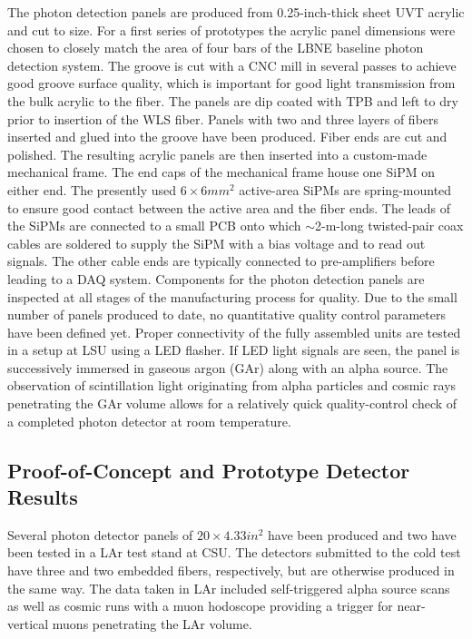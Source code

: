 The photon detection panels are produced from 0.25-inch-thick
sheet UVT acrylic and cut to size. For a first series of prototypes
the acrylic panel dimensions were chosen to closely match the area of
four bars of the LBNE baseline  photon detection system.  The groove is
cut with a CNC mill in several passes to achieve good groove surface
quality, which is important for good light transmission from the bulk
acrylic to the fiber. The panels are dip coated with TPB and left to
dry prior to insertion of the WLS fiber. Panels with two and three
layers of fibers inserted and glued into the groove have been
produced. Fiber ends are cut and polished.  The resulting acrylic
panels are then inserted into a custom-made mechanical frame.%
The end caps of the mechanical frame
house one SiPM on either end. The presently used $6\times6 mm^2$ active-area
SiPMs are spring-mounted to ensure good contact between the active area
and the fiber ends.  The leads of the SiPMs are connected to a small
PCB  onto which $\sim$2-m-long twisted-pair coax cables are soldered to
supply the SiPM with a bias voltage and to read out signals. The other
cable ends are typically connected to pre-amplifiers before leading to
a DAQ system.  Components for the photon detection panels are
inspected at all stages of the manufacturing process for quality. Due
to the small number of panels produced to date, no quantitative quality
control parameters have been defined yet.  Proper connectivity of the
fully assembled units are tested in a setup at LSU using a LED
flasher. If LED light signals are seen, the panel is successively
immersed in gaseous argon (GAr) along with an alpha source. The
observation of %
scintillation light originating from alpha
particles and cosmic rays penetrating the GAr volume allows for a
relatively quick quality-control check of a completed photon detector
at room temperature.

\subsection{Proof-of-Concept and Prototype Detector Results}

Several photon detector panels of $20 \times 4.33 in^2$ have been
produced and two have been tested in a LAr test stand at CSU. The
detectors submitted to the cold test have three and two embedded fibers,
respectively, but are otherwise produced in the same way. The data
taken in LAr included self-triggered alpha source scans as well as
cosmic runs with a muon hodoscope providing a trigger for near-vertical muons penetrating the LAr volume.
